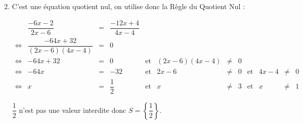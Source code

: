 \documentclass[15pt, mathserif]{beamer}
\begin{document}
 \begin{frame} 
 \begin{enumerate} \setcounter{enumi}{1}  
 	 \item C'est une équation quotient nul, on utilise donc la Règle du Quotient Nul :
 
  \tiny{$\begin{array}{crclcrclcrcl} 
 
 	  & \dfrac{-6x-2}{2x-6} & = &\dfrac{-12x+4}{4x-4} & & & & & & & & \\ 
 	 \Leftrightarrow & \dfrac{-64x+32}{(2x-6)(4x-4)} & = & 0 & & & & & & & & \\ 
 	 \Leftrightarrow & -64x+32 & =& 0 & \text{et} & (2x-6)(4x-4) & \neq & 0 \\ 
 	 \Leftrightarrow & -64x&=&-32& \text{et} & 2x-6& \neq & 0 & \text{et} & 4x-4& \neq & 0 \\ 
 	 \Leftrightarrow & x&=&\dfrac{1}{2} & \text{et} & x &\neq&3 & \text{et} & x & \neq&1
 
 \end{array}$} 
 
 \bigskip 
 
 \normalsize{ $ \dfrac{1}{2} $ n'est pas une valeur interdite donc $S=\left\{ \dfrac{1}{2}\right\}$.} 
 
 \end{enumerate} \end{frame}
\end{document}
